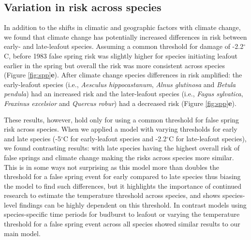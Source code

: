 \documentclass{article}\usepackage[]{graphicx}\usepackage[]{color}
\begin{document}
\subsection*{Variation in risk across species} 
In addition to the shifts in climatic and geographic factors with climate change, we found that climate change has potentially increased differences in risk between early- and late-leafout species. Assuming a common threshold for damage of -2.2$^{\circ}$C, before 1983 false spring risk was slightly higher for species initiating leafout earlier in the spring but overall the risk was more consistent across species (Figure \ref{fig:spp}\textbf{e}). After climate change species differences in risk amplified: the early-leafout species (i.e., \textit{Aesculus hippocastanum}, \textit{Alnus glutinosa} and \textit{Betula pendula}) had an increased risk and the later-leafout species (i.e., \textit{Fagus sylvatica}, \textit{Fraxinus excelsior} and \textit{Quercus robur}) had a decreased risk (Figure \ref{fig:spp}\textbf{e}). 

These results, however, hold only for using a common threshold for false spring risk across species. When we applied a model with varying thresholds for early and late species (-5$^{\circ}$C for early-leafout species and -2.2$^{\circ}$C for late-leafout species), we found contrasting results: with late species having the highest overall risk of false springs and climate change making the risks across species more similar. This is in some ways not surprising as this model more than doubles the threshold for a false spring event for early compared to late species thus biasing the model to find such differences, but it highlights the importance of continued research \citep[e.g.,][]{Lenz2013,Muffler2016,Zohner2020} to estimate the temperature threshold across species, and shows species-level findings can be highly dependent on this threshold. In contrast models using species-specific time periods for budburst to leafout or varying the temperature threshold for a false spring event across all species showed similar results to our main model.
\end{document}
